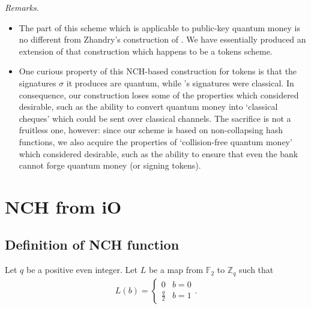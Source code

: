 \documentclass{article}
\begin{document}
\noindent \textit{Remarks.}
\begin{itemize}
    \item The part of this scheme which is applicable to public-key quantum money is no different from Zhandry's construction of \cite{zha17}. We have essentially produced an extension of that construction which happens to be a tokens scheme.
    \item One curious property of this NCH-based construction for tokens is that the signatures $\sigma$ it produces are quantum, while \cite{tokens}'s signatures were classical. In consequence, our construction loses some of the properties which \cite{tokens} considered desirable, such as the ability to convert quantum money into `classical cheques' which could be sent over classical channels. The sacrifice is not a fruitless one, however: since our scheme is based on non-collapsing hash functions, we also acquire the properties of `collision-free quantum money' which \cite{zha17} considered desirable, such as the ability to ensure that even the bank cannot forge quantum money (or signing tokens).
\end{itemize}

\section{NCH from iO}

\subsection{Definition of NCH function}

Let $q$ be a positive even integer. Let $L$ be a map from $\mathbb{F}_2$ to $\mathbb{Z}_q$ such that
\begin{align}
	L(b) =
	\begin{cases}
		0 & b = 0 \\
		\frac{q}{2} & b = 1
	\end{cases}.
\end{align}

\end{document}
